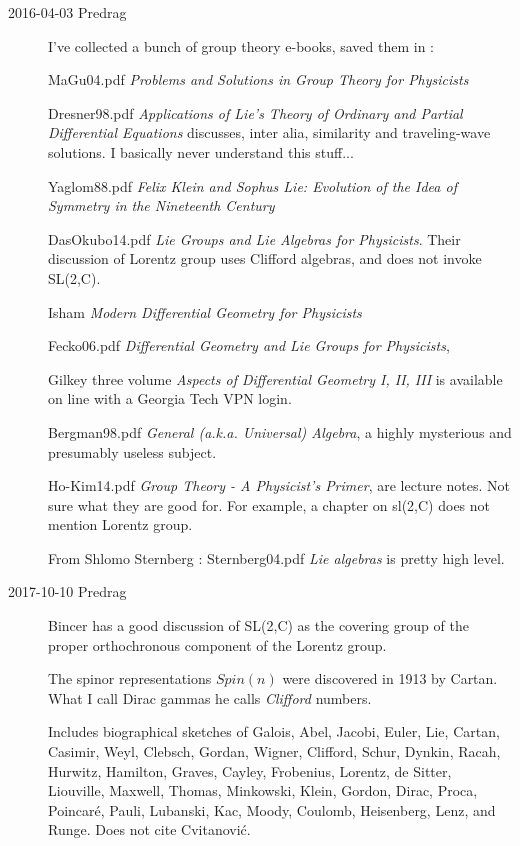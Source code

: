 \begin{description}
\item[2016-04-03 Predrag] I've collected a bunch of group theory e-books,
saved them in :

MaGu04.pdf
{\em Problems and Solutions in Group Theory for Physicists}

Dresner98.pdf
{\em Applications of Lie's Theory of Ordinary and Partial Differential Equations}
discusses, inter alia, similarity and traveling-wave solutions.
I basically never understand this stuff...

Yaglom88.pdf {\em Felix Klein and Sophus Lie: Evolution of the
Idea of Symmetry in the Nineteenth Century}

DasOkubo14.pdf
{\em Lie Groups and Lie Algebras for Physicists}.
Their discussion of Lorentz group uses
Clifford algebras, and does not invoke SL(2,C).

Isham
{\em Modern Differential Geometry for Physicists}

Fecko06.pdf
{\em Differential Geometry and Lie Groups for Physicists},

Gilkey \etal{} three volume
{\em Aspects of Differential Geometry I, II, III} is available on line
with a Georgia Tech VPN login.

Bergman98.pdf
{\em General (a.k.a. Universal) Algebra},
a highly mysterious and presumably useless subject.

{Ho-Kim14.pdf} {\em  Group Theory - A Physicist's Primer}, are lecture
notes. Not sure what they are good for. For example, a chapter on sl(2,C)
does not mention Lorentz group.

From Shlomo Sternberg
:
Sternberg04.pdf {\em Lie algebras} is pretty high level.

\item[2017-10-10  Predrag]
Bincer has a good discussion of SL(2,C) as the covering
group of the proper orthochronous component  of the Lorentz group.

The spinor representations $Spin(n)$ were discovered in 1913
by Cartan. What I call Dirac gammas he calls \emph{Clifford} numbers.

Includes biographical sketches of
Galois, Abel, Jacobi, Euler, Lie, Cartan,
Casimir, Weyl, Clebsch, Gordan, Wigner,
Clifford, Schur,
Dynkin, Racah,
Hurwitz, Hamilton, Graves, Cayley, Frobenius,
Lorentz, de Sitter, Liouville, Maxwell, Thomas,
Minkowski, Klein, Gordon, Dirac, Proca,
Poincar\'e, Pauli, Lubanski, Kac, Moody,
Coulomb, Heisenberg, Lenz, and Runge. Does not cite Cvitanovi\'c.


\end{description}
